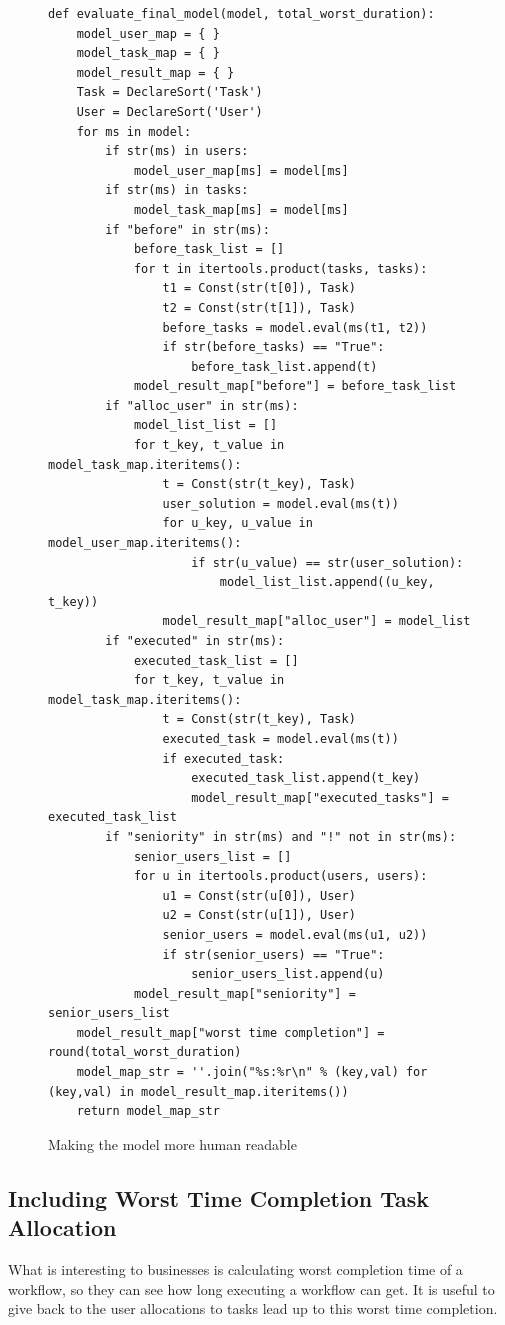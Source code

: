 \documentclass[a4paper]{report}
\begin{document}
\begin{figure}[H]
\lstset{numbers=left, showspaces=false,
    showstringspaces=false, tabsize=2, breaklines=true,
    xleftmargin=5.0ex,
}
\begin{lstlisting}[frame=single]
def evaluate_final_model(model, total_worst_duration):
	model_user_map = { }
	model_task_map = { }
	model_result_map = { }
	Task = DeclareSort('Task')
	User = DeclareSort('User')
	for ms in model:
		if str(ms) in users:
			model_user_map[ms] = model[ms]
		if str(ms) in tasks:
			model_task_map[ms] = model[ms]
		if "before" in str(ms):
			before_task_list = []
			for t in itertools.product(tasks, tasks):
				t1 = Const(str(t[0]), Task)
				t2 = Const(str(t[1]), Task)
				before_tasks = model.eval(ms(t1, t2))
				if str(before_tasks) == "True":
					before_task_list.append(t)
			model_result_map["before"] = before_task_list
		if "alloc_user" in str(ms):
			model_list_list = []
			for t_key, t_value in model_task_map.iteritems():
				t = Const(str(t_key), Task)
				user_solution = model.eval(ms(t))
				for u_key, u_value in model_user_map.iteritems():
					if str(u_value) == str(user_solution):
						model_list_list.append((u_key, t_key))
				model_result_map["alloc_user"] = model_list
		if "executed" in str(ms):
			executed_task_list = []
			for t_key, t_value in model_task_map.iteritems():
				t = Const(str(t_key), Task)
				executed_task = model.eval(ms(t))
				if executed_task:
					executed_task_list.append(t_key)
					model_result_map["executed_tasks"] = executed_task_list
		if "seniority" in str(ms) and "!" not in str(ms):
			senior_users_list = []
			for u in itertools.product(users, users):
				u1 = Const(str(u[0]), User)
				u2 = Const(str(u[1]), User)
				senior_users = model.eval(ms(u1, u2))
				if str(senior_users) == "True":
					senior_users_list.append(u)
			model_result_map["seniority"] = senior_users_list
	model_result_map["worst time completion"] = round(total_worst_duration)
	model_map_str = ''.join("%s:%r\n" % (key,val) for (key,val) in model_result_map.iteritems())
	return model_map_str
\end{lstlisting}
\caption{Making the model more human readable}
\label{fig:Making the model more human readable}
\end{figure}

\subsection{Including Worst Time Completion Task Allocation}
What is interesting to businesses is calculating worst completion time of a workflow, so they can see how long executing a workflow can get. It is useful to give back to the user allocations to tasks lead up to this worst time completion. \\
\end{document}
